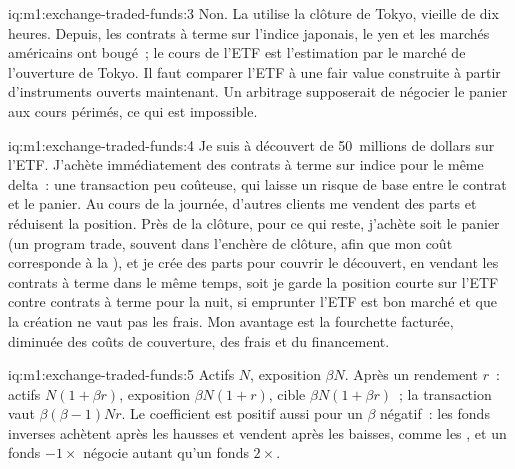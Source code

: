 \begin{solution}{iq:m1:exchange-traded-funds:3}
Non. La  utilise la clôture de Tokyo, vieille de dix heures. Depuis, les contrats à terme sur l'indice
japonais, le yen et les marchés américains ont bougé~; le cours de l'ETF est l'estimation par le marché
de l'ouverture de Tokyo. Il faut comparer l'ETF à une fair value construite à partir d'instruments ouverts maintenant.
Un arbitrage supposerait de négocier
le panier aux cours périmés, ce qui est impossible.
\end{solution}

\begin{solution}{iq:m1:exchange-traded-funds:4}
Je suis à découvert de 50~millions de dollars sur l'ETF. J'achète immédiatement
des contrats à terme sur indice pour le même delta~: une transaction peu coûteuse, qui laisse
un risque de base entre le contrat et le panier. Au cours de la journée, d'autres clients me vendent
des parts et réduisent la position. Près de la clôture, pour ce qui reste, j'achète soit
le panier (un program trade, souvent dans l'enchère de clôture, afin que mon coût corresponde à la ),
et je crée des parts pour couvrir le découvert, en vendant les contrats à terme dans le même temps, soit je garde
la position courte sur l'ETF contre contrats à terme pour la nuit, si emprunter l'ETF est bon marché et que la création
ne vaut pas les frais. Mon avantage est la fourchette facturée, diminuée des coûts de couverture,
des frais et du financement.
\end{solution}

\begin{solution}{iq:m1:exchange-traded-funds:5}
Actifs $N$, exposition $\beta N$. Après un rendement $r$~: actifs $N(1+\beta r)$,
exposition $\beta N(1+r)$, cible $\beta N(1+\beta r)$~; la transaction vaut $\beta(\beta-1)Nr$.
Le coefficient est positif aussi pour un $\beta$ négatif~: les fonds inverses achètent après
les hausses et vendent après les baisses, comme les , et un fonds $-1\times$
négocie autant qu'un fonds $2\times$.
\end{solution}

